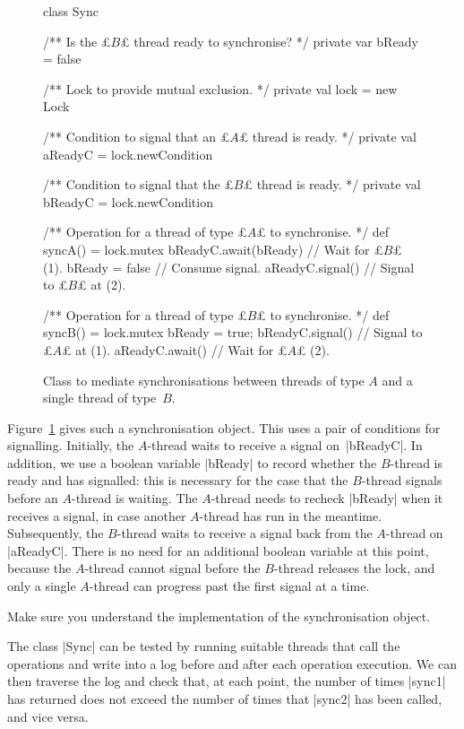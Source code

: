 \begin{figure}
\begin{scala}
class Sync{
  /** Is the £$B$£ thread ready to synchronise? */
  private var bReady = false

  /** Lock to provide mutual exclusion. */
  private val lock = new Lock

  /** Condition to signal that an £$A$£ thread is ready. */
  private val aReadyC = lock.newCondition

  /** Condition to signal that the £$B$£ thread is ready. */
  private val bReadyC = lock.newCondition

  /** Operation for a thread of type £$A$£ to synchronise. */
  def syncA() = lock.mutex{
    bReadyC.await(bReady)  // Wait for £$B$£ (1).
    bReady = false // Consume signal.
    aReadyC.signal() // Signal to £$B$£ at (2).
  }

  /** Operation for a thread of type £$B$£ to synchronise. */
  def syncB() = lock.mutex{
    bReady = true; bReadyC.signal() // Signal to £$A$£ at (1).
    aReadyC.await() // Wait for £$A$£ (2).
  }
}
\end{scala}
\caption{Class to mediate synchronisations between threads of type $A$ and a
  single thread of type~$B$.}
\label{fig:barber-Sync}
\end{figure}


Figure~\ref{fig:barber-Sync} gives such a synchronisation object.  This uses a
pair of conditions for signalling.  Initially, the $A$-thread waits to receive
a signal on~|bReadyC|.  In addition, we use a boolean variable |bReady| to
record whether the $B$-thread is ready and has signalled: this is
necessary for the case that the $B$-thread signals before an $A$-thread is
waiting.  The $A$-thread needs to recheck |bReady| when it receives a signal,
in case another $A$-thread has run in the meantime.  Subsequently, the
$B$-thread waits to receive a signal back from the $A$-thread on |aReadyC|.
There is no need for an additional boolean variable at this point, because the
$A$-thread cannot signal before the $B$-thread releases the lock, and only a
single $A$-thread can progress past the first signal at a time.


\begin{instruction}
Make sure you understand the implementation of the synchronisation object.
\end{instruction}

The class |Sync| can be tested by running suitable threads that call the
operations and write into a log before and after each operation execution.  We
can then traverse the log and check that, at each point, the number of times
|sync1| has returned does not exceed the number of times that |sync2| has been
called, and vice versa.

